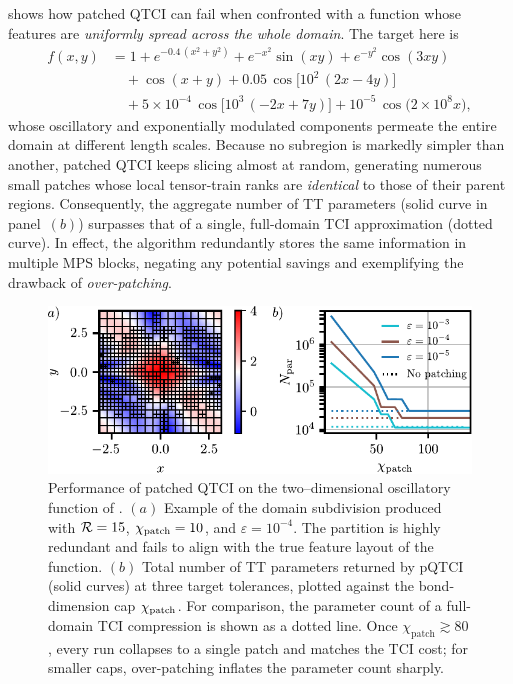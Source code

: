  shows how patched QTCI can fail when confronted with a function whose features are \emph{uniformly spread across the whole domain}.  
The target here is  
\begin{align}
\label{eq:2Dfunction}
f(x,y) &=
  1
  + e^{-0.4\,(x^{2}+y^{2})}
  + e^{-x^{2}}\sin(xy)
  + e^{-y^{2}}\cos(3xy) \\
  &\quad + \cos(x+y)
  + 0.05\,\cos\!\bigl[10^{2}\,(2x-4y)\bigr] \nonumber\\
  &\quad + 5\!\times\!10^{-4}\,\cos\!\bigl[10^{3}\,(-2x+7y)\bigr]
  + 10^{-5}\,\cos\!\bigl(2\times10^{8}x\bigr), \nonumber
\end{align}
whose oscillatory and exponentially modulated components permeate the entire domain at different length scales.  
Because no subregion is markedly simpler than another, patched QTCI keeps slicing almost at random, generating numerous small patches whose local tensor-train ranks are \emph{identical} to those of their parent regions.  
Consequently, the aggregate number of TT parameters (solid curve in panel~$(b)$) surpasses that of a single, full-domain TCI approximation (dotted curve).  
In effect, the algorithm redundantly stores the same information in multiple MPS blocks, negating any potential savings and exemplifying the drawback of \emph{over-patching}.


\begin{figure}[ht!]
	\centering
	\includegraphics{figures/OverPatching.pdf}
	\caption{Performance of patched QTCI on the two–dimensional oscillatory function of .  $(a)$ Example of the domain subdivision produced with $\mathcal{R} = 15$, $\chi_{\text{patch}} = 10$, and $\varepsilon = 10^{-4}$.  The partition is highly redundant and fails to align with the true feature layout of the function. $(b)$ Total number of TT parameters returned by pQTCI (solid curves) at three target tolerances, plotted against the bond-dimension cap $\chi_{\text{patch}}$.  For comparison, the parameter count of a full-domain TCI compression is shown as a dotted line.  Once $\chi_{\text{patch}}\gtrsim 80$, every run collapses to a single patch and matches the TCI cost; for smaller caps, over-patching inflates the parameter count sharply.}
	\label{fig:2DOverpatching}
\end{figure}

